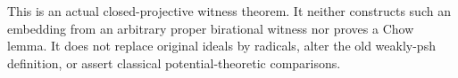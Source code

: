 \begin{remark}
This is an actual closed-projective witness theorem. It neither constructs
such an embedding from an arbitrary proper birational witness nor proves a
Chow lemma. It does not replace original ideals by radicals, alter the old
weakly-psh definition, or assert classical potential-theoretic comparisons.
\end{remark}
